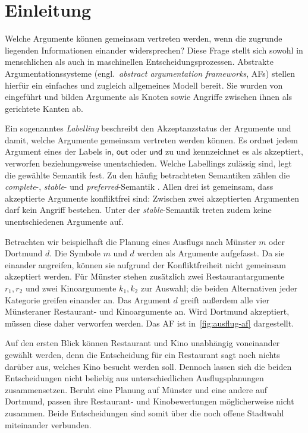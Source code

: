 \chapter{Einleitung}
\label{chap:einleitung}

Welche Argumente können gemeinsam vertreten werden, wenn die zugrunde
liegenden Informationen einander widersprechen? Diese Frage stellt sich
sowohl in menschlichen als auch in maschinellen Entscheidungsprozessen.
Abstrakte Argumentationssysteme
(engl.\ \emph{abstract argumentation frameworks}, AFs) stellen hierfür
ein einfaches und zugleich allgemeines Modell bereit. Sie wurden von
\textcite{dung:1995:af} eingeführt und bilden Argumente als Knoten 
sowie Angriffe zwischen ihnen als gerichtete Kanten ab.

Ein sogenanntes \emph{Labelling} beschreibt den Akzeptanzstatus der
Argumente und damit, welche Argumente gemeinsam vertreten werden
können. Es ordnet jedem Argument eines der Labels
\(\mathsf{in}\), \(\mathsf{out}\) oder \(\mathsf{und}\) zu und
kennzeichnet es als akzeptiert, verworfen beziehungsweise unentschieden.
Welche Labellings zulässig sind, legt die gewählte Semantik fest. Zu den
häufig betrachteten Semantiken zählen die \emph{complete}-,
\emph{stable}- und \emph{preferred}-Semantik
\parencite{dung:1995:af}. Allen drei ist gemeinsam, dass akzeptierte
Argumente konfliktfrei sind: Zwischen zwei akzeptierten Argumenten darf
kein Angriff bestehen. Unter der \emph{stable}-Semantik treten zudem
keine unentschiedenen Argumente auf.

Betrachten wir beispielhaft die Planung eines Ausflugs nach Münster
\(m\) oder Dortmund \(d\). Die Symbole \(m\) und \(d\) werden als
Argumente aufgefasst. Da sie einander angreifen, können sie aufgrund
der Konfliktfreiheit nicht gemeinsam akzeptiert werden. Für Münster
stehen zusätzlich zwei Restaurantargumente \(r_1,r_2\) und zwei
Kinoargumente \(k_1,k_2\) zur Auswahl; die beiden Alternativen jeder
Kategorie greifen einander an. Das Argument \(d\) greift außerdem alle
vier Münsteraner Restaurant- und Kinoargumente an. Wird Dortmund
akzeptiert, müssen diese daher verworfen werden.
Das AF ist in~\ref{fig:ausflug-af} dargestellt.

Auf den ersten Blick können Restaurant und Kino unabhängig voneinander
gewählt werden, denn die Entscheidung für ein Restaurant sagt noch nichts
darüber aus, welches Kino besucht werden soll. Dennoch lassen sich die
beiden Entscheidungen nicht beliebig aus unterschiedlichen
Ausflugsplanungen zusammensetzen. Beruht eine Planung auf Münster und eine
andere auf Dortmund, passen ihre Restaurant- und Kinobewertungen
möglicherweise nicht zusammen. Beide Entscheidungen sind somit über die
noch offene Stadtwahl miteinander verbunden.

